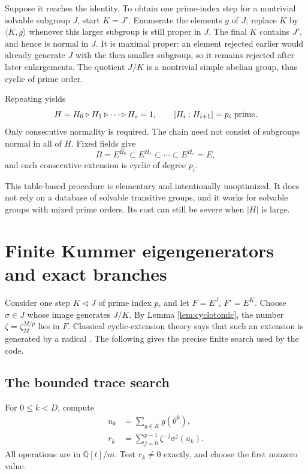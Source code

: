 \documentclass[11pt,letterpaper]{article}
\theoremstyle{definition}\newtheorem{definition}[theorem]{Definition}
\theoremstyle{remark}\newtheorem{remark}[theorem]{Remark}
\newcommand{\Q}{\mathbb Q}
\begin{document}
Suppose it reaches the identity. To obtain one prime-index step for a
nontrivial solvable subgroup $J$, start $K=J'$. Enumerate the elements $g$
of $J$; replace $K$ by $\langle K,g\rangle$ whenever this larger subgroup
is still proper in $J$. The final $K$ contains $J'$, and hence is normal
in $J$. It is maximal proper: an element rejected earlier would already
generate $J$ with the then smaller subgroup, so it remains rejected after
later enlargements. The quotient $J/K$ is a nontrivial simple abelian
group, thus cyclic of prime order.

Repeating yields
\begin{equation}\label{eq:chain}
 H=H_0\triangleright H_1\triangleright\cdots\triangleright H_s=1,
 \qquad [H_i:H_{i+1}]=p_i\ \hbox{prime}.
\end{equation}
Only consecutive normality is required. The chain need not consist of
subgroups normal in all of $H$. Fixed fields give
\[
 B=E^{H_0}\subset E^{H_1}\subset\cdots\subset E^{H_s}=E,
\]
and each consecutive extension is cyclic of degree $p_i$.

This table-based procedure is elementary and intentionally unoptimized.
It does not rely on a database of solvable transitive groups, and it works
for solvable groups with mixed prime orders. Its cost can still be severe
when $|H|$ is large.

\section{Finite Kummer eigengenerators and exact branches}
\label{sec:tower}
Consider one step $K\triangleleft J$ of prime index $p$, and let
$F=E^J$, $F'=E^K$. Choose $\sigma\in J$ whose image generates $J/K$.
By Lemma \ref{lem:cyclotomic}, the number
$\zeta=\zeta_M^{M/p}$ lies in $F$. Classical cyclic-extension theory
says that such an extension is generated by a radical
\cite[Proposition 5.27]{milne}. The following gives the precise finite
search used by the code.

\subsection{The bounded trace search}
For $0\leq k<D$, compute
\begin{align}
 u_k&=\sum_{g\in K}g(\theta^k),\label{eq:trace}\\
 r_k&=\sum_{j=0}^{p-1}\zeta^{-j}\sigma^j(u_k).\label{eq:eigen}
\end{align}
All operations are in $\Q[t]/m$. Test $r_k\ne0$ exactly, and choose the
first nonzero value.
\end{document}
